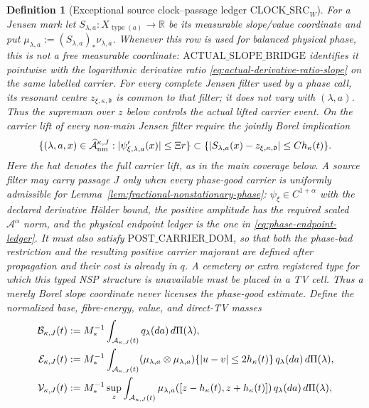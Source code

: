 \documentclass[11pt]{article}
\newtheorem{definition}[theorem]{Definition}
\begin{document}
\begin{definition}[Exceptional source clock--passage ledger
$\mathrm{CLOCK\_SRC}_{W}$]
For a Jensen mark let $S_{\lambda,a}:X_{\operatorname{type}(a)}\to\mathbb R$
be its measurable slope/value coordinate and put
$\mu_{\lambda,a}:=(S_{\lambda,a})_*\nu_{\lambda,a}$.
Whenever this row is used for balanced physical phase, this is not a free
measurable coordinate: $\mathrm{ACTUAL\_SLOPE\_BRIDGE}$ identifies it
pointwise with the logarithmic derivative ratio
\eqref{eq:actual-derivative-ratio-slope} on the same labelled carrier.
For every complete Jensen filter used by a phase call, its resonant centre
$z_{\xi,\kappa,\mathfrak d}$ is common to that filter; it does not vary with
$(\lambda,a)$.  Thus the supremum over $z$ below controls the actual lifted
carrier event.  On the carrier lift of every non-main Jensen filter require
the jointly Borel implication
\begin{equation}
\label{eq:nonmain-phase-bad-implication}
 \{(\lambda,a,x)\in\widehat{\mathcal A}_{\rm nm}^{\kappa,J}:
       |\psi'_{\xi,\lambda,a}(x)|\le\Xi r\}
 \subset
 \{|S_{\lambda,a}(x)-z_{\xi,\kappa,\mathfrak d}|
       \le Ch_\kappa(t)\}.
\end{equation}
Here the hat denotes the full carrier lift, as in the main coverage below.
A source filter may carry passage $J$ only when every phase-good carrier is
uniformly admissible for Lemma~\ref{lem:fractional-nonstationary-phase}:
$\psi_\xi\in C^{1+\alpha}$ with the declared derivative H\"older bound, the
positive amplitude has the required scaled $\mathcal A^\alpha$ norm, and
the physical endpoint ledger is the one in
\eqref{eq:phase-endpoint-ledger}.  It must also satisfy
$\mathrm{POST\_CARRIER\_DOM}$, so that both the phase-bad restriction and
the resulting positive carrier majorant are defined after propagation and
their cost is already in $q$.  A cemetery or extra registered type for
which this typed NSP structure is unavailable must be placed in a TV cell.
Thus a merely Borel slope coordinate never licenses the phase-good estimate.
Define the normalized
base, fibre-energy, value, and direct-TV masses
\begin{align}
 \mathcal B_{\kappa,J}(t)&:=M_*^{-1}
  \int_{\mathcal A_{\kappa,J}(t)}q_\lambda(da)\,d\Pi(\lambda),\notag\\
 \mathcal E_{\kappa,J}(t)&:=M_*^{-1}
  \int_{\mathcal A_{\kappa,J}(t)}
  (\mu_{\lambda,a}\otimes\mu_{\lambda,a})
  \{|u-v|\le2h_\kappa(t)\}\,q_\lambda(da)\,d\Pi(\lambda),\notag\\
 \mathcal V_{\kappa,J}(t)&:=M_*^{-1}\sup_z
  \int_{\mathcal A_{\kappa,J}(t)}
  \mu_{\lambda,a}([z-h_\kappa(t),z+h_\kappa(t)])
  \,q_\lambda(da)\,d\Pi(\lambda),\notag\\

\end{align}
\end{definition}
\end{document}
